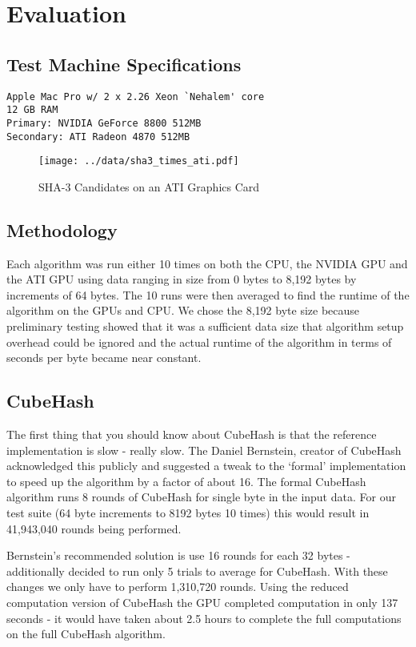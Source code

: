 \section*{Evaluation}

\subsection*{Test Machine Specifications}
\begin{verbatim}
Apple Mac Pro w/ 2 x 2.26 Xeon `Nehalem' core
12 GB RAM
Primary: NVIDIA GeForce 8800 512MB
Secondary: ATI Radeon 4870 512MB
\end{verbatim}


\begin{figure}[tb]
\texttt{[image: ../data/sha3\_times\_ati.pdf]}
\caption{SHA-3 Candidates on an ATI Graphics Card}\label{fig:sha3_times_ati}
\end{figure}

\subsection*{Methodology}
Each algorithm was run either 10 times on both the CPU, the NVIDIA GPU and the ATI GPU using data ranging in size from 0 bytes to 8,192 bytes by increments of 64 bytes.
The 10 runs were then averaged to find the runtime of the algorithm on the GPUs and CPU.
We chose the 8,192 byte size because preliminary testing showed that it was a sufficient data size that algorithm setup overhead could be ignored and the actual runtime of the algorithm in terms of seconds per byte became near constant.

\subsection*{CubeHash}
The first thing that you should know about CubeHash is that the reference implementation is  slow - really slow.
The Daniel Bernstein, creator of CubeHash acknowledged this publicly\cite{Bernstein} and suggested a tweak to the `formal' implementation to speed up the algorithm by a factor of about 16.
The formal CubeHash algorithm runs 8 rounds of CubeHash for single byte in the input data. For our test suite (64 byte increments to 8192 bytes 10 times) this would result in 41,943,040 rounds being performed.

Bernstein's recommended solution is use 16 rounds for each 32 bytes - additionally decided to run only 5 trials to average for CubeHash.
With these changes we only have to perform 1,310,720 rounds.
Using the reduced computation version of CubeHash the GPU completed computation in only 137 seconds - it would have taken about 2.5 hours to complete the full computations on the full CubeHash algorithm.

